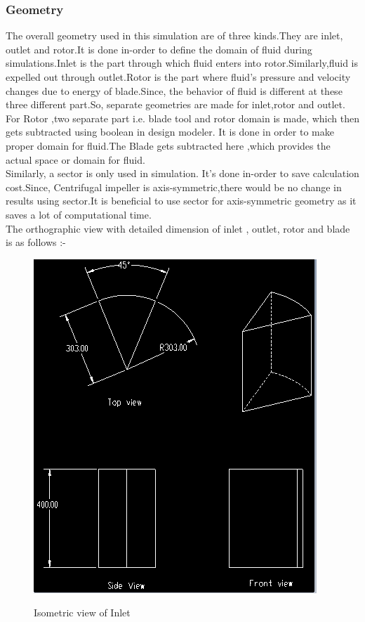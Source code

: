 \documentclass[11pt]{article}
\begin{document}
\subsubsection{Geometry}
 The overall geometry  used in this simulation are of three kinds.They are inlet, outlet and rotor.It is done in-order to define the domain of fluid during simulations.Inlet is the part through which fluid enters into rotor.Similarly,fluid is expelled out through outlet.Rotor is the part where fluid's pressure and velocity changes due to energy of blade.Since, the behavior of fluid is different at these three different part.So, separate geometries are made for inlet,rotor and outlet.\\
 For Rotor ,two separate part i.e. blade tool and rotor domain is made, which then gets subtracted using boolean in design modeler. It is done in order to make proper domain for fluid.The Blade gets subtracted here ,which provides the actual space or domain for fluid.\\
 Similarly, a sector is only used in simulation. It's done in-order to save calculation cost.Since, Centrifugal impeller is axis-symmetric,there would be no change in results using sector.It is beneficial to use sector for axis-symmetric geometry as it saves a lot of computational time.\\
 The orthographic view with detailed dimension of inlet , outlet, rotor and blade is as follows :-\\
 \begin{center}
 \begin{figure}[hbt!]
 \centering
 \includegraphics[scale=.6]{inlet.png}\\
 \caption{Isometric view of Inlet}
 \end{figure}
 \end{center}
\end{document}
